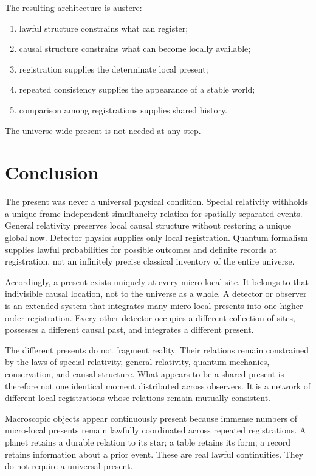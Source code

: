\documentclass[12pt,onecolumn]{article}
\begin{document}
The resulting architecture is austere:

\begin{enumerate}
\item lawful structure constrains what can register;
\item causal structure constrains what can become locally available;
\item registration supplies the determinate local present;
\item repeated consistency supplies the appearance of a stable world;
\item comparison among registrations supplies shared history.
\end{enumerate}

The universe-wide present is not needed at any step.

\section{Conclusion}

The present was never a universal physical condition. Special relativity withholds a unique frame-independent simultaneity relation for spatially separated events. General relativity preserves local causal structure without restoring a unique global now. Detector physics supplies only local registration. Quantum formalism supplies lawful probabilities for possible outcomes and definite records at registration, not an infinitely precise classical inventory of the entire universe.

Accordingly, a present exists uniquely at every micro-local site. It belongs to that indivisible causal location, not to the universe as a whole. A detector or observer is an extended system that integrates many micro-local presents into one higher-order registration. Every other detector occupies a different collection of sites, possesses a different causal past, and integrates a different present.

The different presents do not fragment reality. Their relations remain constrained by the laws of special relativity, general relativity, quantum mechanics, conservation, and causal structure. What appears to be a shared present is therefore not one identical moment distributed across observers. It is a network of different local registrations whose relations remain mutually consistent.

Macroscopic objects appear continuously present because immense numbers of micro-local presents remain lawfully coordinated across repeated registrations. A planet retains a durable relation to its star; a table retains its form; a record retains information about a prior event. These are real lawful continuities. They do not require a universal present.
\end{document}

